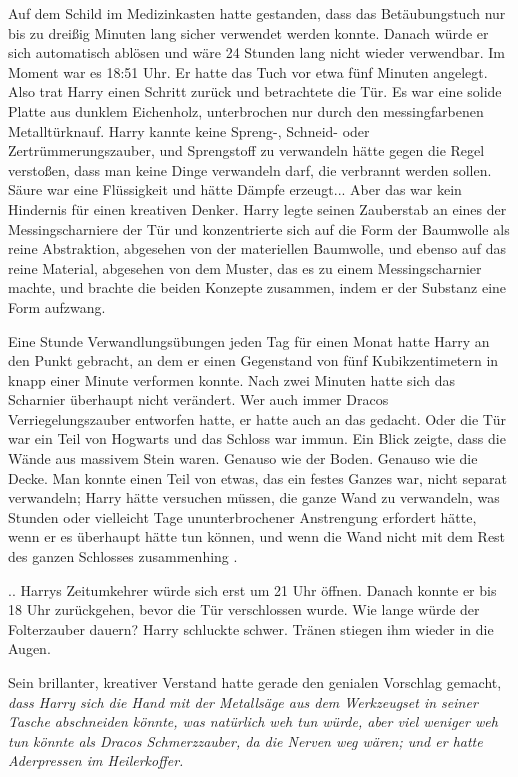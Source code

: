 Auf dem Schild im Medizinkasten hatte gestanden, dass das Betäubungstuch nur bis
zu dreißig Minuten lang sicher verwendet werden konnte. Danach würde er sich
automatisch ablösen und wäre 24 Stunden lang nicht wieder verwendbar. Im Moment
war es 18:51 Uhr. Er hatte das Tuch vor etwa fünf Minuten angelegt. Also trat
Harry einen Schritt zurück und betrachtete die Tür. Es war eine solide Platte
aus dunklem Eichenholz, unterbrochen nur durch den messingfarbenen
Metalltürknauf. Harry kannte keine Spreng-, Schneid- oder Zertrümmerungszauber,
und Sprengstoff zu verwandeln hätte gegen die Regel verstoßen, dass man keine
Dinge verwandeln darf, die verbrannt werden sollen. Säure war eine Flüssigkeit
und hätte Dämpfe erzeugt... Aber das war kein Hindernis für einen kreativen
Denker. Harry legte seinen Zauberstab an eines der Messingscharniere der Tür und
konzentrierte sich auf die Form der Baumwolle als reine Abstraktion, abgesehen
von der materiellen Baumwolle, und ebenso auf das reine Material, abgesehen von
dem Muster, das es zu einem Messingscharnier machte, und brachte die beiden
Konzepte zusammen, indem er der Substanz eine Form aufzwang.

Eine Stunde Verwandlungsübungen jeden Tag für einen Monat hatte Harry an den
Punkt gebracht, an dem er einen Gegenstand von fünf Kubikzentimetern in knapp
einer Minute verformen konnte. Nach zwei Minuten hatte sich das Scharnier
überhaupt nicht verändert. Wer auch immer Dracos Verriegelungszauber entworfen
hatte, er hatte auch an das gedacht. Oder die Tür war ein Teil von Hogwarts und
das Schloss war immun. Ein Blick zeigte, dass die Wände aus massivem Stein
waren. Genauso wie der Boden. Genauso wie die Decke. Man konnte einen Teil von
etwas, das ein festes Ganzes war, nicht separat verwandeln; Harry hätte
versuchen müssen, die ganze Wand zu verwandeln, was Stunden oder vielleicht Tage
ununterbrochener Anstrengung erfordert hätte, wenn er es überhaupt hätte tun
können, und wenn die Wand nicht mit dem Rest des ganzen Schlosses zusammenhing .

.. Harrys Zeitumkehrer würde sich erst um 21 Uhr öffnen. Danach konnte er bis 18
Uhr zurückgehen, bevor die Tür verschlossen wurde. Wie lange würde der
Folterzauber dauern? Harry schluckte schwer. Tränen stiegen ihm wieder in die
Augen.

Sein brillanter, kreativer Verstand hatte gerade den genialen Vorschlag gemacht,
\emph{dass Harry sich die Hand mit der Metallsäge aus dem Werkzeugset in seiner
Tasche abschneiden könnte, was natürlich weh tun würde, aber viel weniger weh
tun könnte als Dracos Schmerzzauber, da die Nerven weg wären; und er hatte
Aderpressen im Heilerkoffer. }

